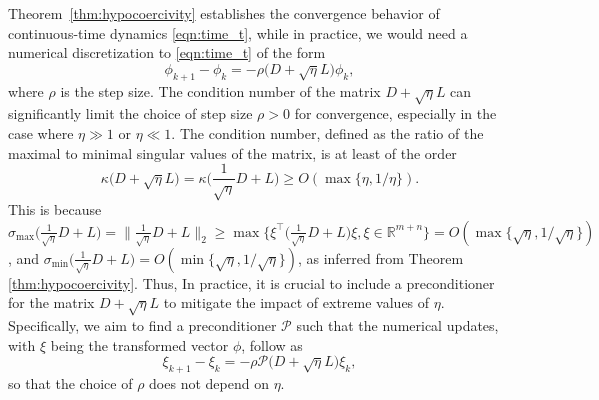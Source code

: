 \documentclass[11pt]{article}
\newcommand{\R}{\ensuremath{\mathbb{R}}}
\newcommand{\1}{\mathds{1}}
\begin{document}
Theorem~\ref{thm:hypocoercivity} establishes the convergence behavior of continuous-time dynamics \eqref{eqn:time_t}, while in practice, we would need a numerical discretization to \eqref{eqn:time_t} of the form 
\begin{equation}\label{eqn:numer}
    \phi_{k+1}-\phi_k = -\rho\Big(D +\sqrt{\eta} L\Big)\phi_k,
\end{equation}
where $\rho$ is the step size. The condition number of the matrix $D+\sqrt{\eta}L$ can significantly limit the choice of step size $\rho>0$ for convergence, especially in the case  where $\eta\gg1$ or $\eta\ll 1$. The condition number, defined as the ratio of the maximal to minimal singular values of the matrix, is at least of the order
\begin{equation}
   \kappa\Big(D +\sqrt{\eta}L\Big)= \kappa\Big(\frac{1}{\sqrt{\eta}}D +L\Big)\geq O(\max\{\eta, 1/\eta\}).
\end{equation}
This is because $\sigma_{\max}\Big(\frac{1}{\sqrt{\eta}}D +L\Big) = \Big\|\frac{1}{\sqrt{\eta}}D +L\Big\|_2\geq \max\{\xi^\top\Big(\frac{1}{\sqrt{\eta}}D +L\Big)\xi, \xi\in \R^{m+n}\}= O(\max\{\sqrt{\eta},1/\sqrt{\eta}\})$, and  $\sigma_{\min}\Big(\frac{1}{\sqrt{\eta}}D +L\Big)=O(\min\{\sqrt{\eta},1/\sqrt{\eta}\})$, as inferred from Theorem \ref{thm:hypocoercivity}. Thus, In practice, it is crucial to include a preconditioner for the matrix $D +\sqrt{\eta}L$ to mitigate the impact of extreme values of $\eta$. Specifically, we aim to find a preconditioner $\mathcal{P}$ such that the numerical updates, with $\xi$ being the transformed vector $\phi$, follow as
\begin{equation}\label{eqn:target}
    \xi_{k+1}-\xi_k = -\rho\mathcal{P}\Big(D +\sqrt{\eta} L\Big)\xi_k,
\end{equation}
so that the choice of $\rho$ does not depend on $\eta$.
\end{document}
